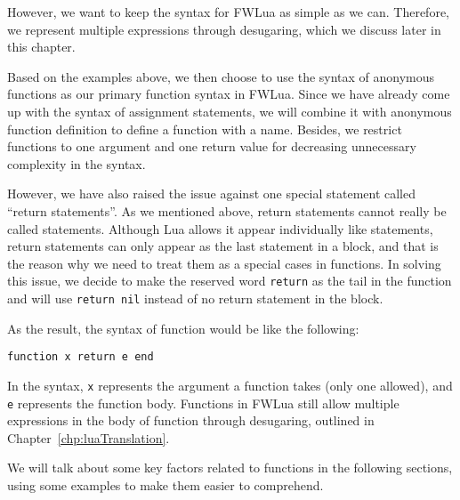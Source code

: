 However, we want to keep the syntax for FWLua as simple as we can. Therefore, we represent multiple expressions through desugaring, which we discuss later in this chapter.

Based on the examples above, we then choose to use the syntax of anonymous functions as our primary function syntax in FWLua. Since we have already come up with the syntax of assignment statements, we will combine it with anonymous function definition to define a function with a name. Besides, we restrict functions to one argument and one return value for decreasing unnecessary complexity in the syntax.

However, we have also raised the issue against one special statement called ``return statements''. As we mentioned above, return statements cannot really be called statements. Although Lua allows it appear individually like statements, return statements can only appear as the last statement in a block, and that is the reason why we need to treat them as a special cases in functions. In solving this issue, we decide to make the reserved word {\tt return} as the tail in the function and will use {\tt return nil} instead of no return statement in the block.

As the result, the syntax of function would be like the following:
\begin{verbatim}
function x return e end
\end{verbatim}
In the syntax, {\tt x} represents the argument a function takes (only one allowed), and {\tt e} represents the function body. Functions in FWLua still allow multiple expressions in the body of function through desugaring, outlined in Chapter~\ref{chp:luaTranslation}.

We will talk about some key factors related to functions in the following sections, using some examples to make them easier to comprehend.

